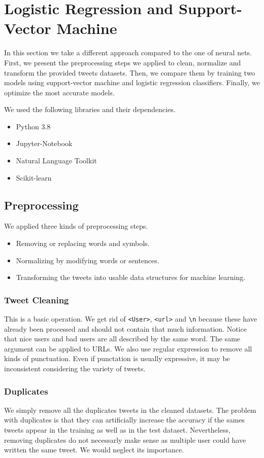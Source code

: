 \documentclass[11pt, a4paper, twocolumn]{article}
\begin{document}
\section{Logistic Regression and Support-Vector Machine}
In this section we take a different approach compared to the one of neural nets. First, we present the preprocessing steps we applied to clean, normalize and transform the provided tweets datasets. Then, we compare them by training two models using support-vector machine and logistic regression classifiers. Finally, we optimize the most accurate models.

We used the following libraries and their dependencies.
\begin{itemize}
	\setlength\itemsep{1px}
	\item Python 3.8
	\item Jupyter-Notebook
	\item Natural Language Toolkit
	\item Scikit-learn
\end{itemize}

\subsection{Preprocessing}
We applied three kinds of preprocessing steps.
\begin{itemize}
	\setlength\itemsep{1px}
	\item Removing or replacing words and symbols.
	\item Normalizing by modifying words or sentences.
	\item Transforming the tweets into usable data structures for machine learning.
\end{itemize}

\subsubsection{Tweet Cleaning}
This is a basic operation. We get rid of \texttt{<User>}, \texttt{<url>} and \verb"\n" because these have already been processed and should not contain that much information. Notice that nice users and bad users are all described by the same word. The same argument can be applied to URLs. We also use regular expression to remove all kinds of punctuation. Even if punctation is usually expressive, it may be inconsistent considering the variety of tweets.

\subsubsection{Duplicates}
We simply remove all the duplicates tweets in the cleaned datasets. The problem with duplicates is that they can artificially increase the accuracy if the sames tweets appear in the training as well as in the test dataset. Nevertheless, removing duplicates do not necessarly make sense as multiple user could have written the same tweet. We would neglect its importance.
\end{document}
